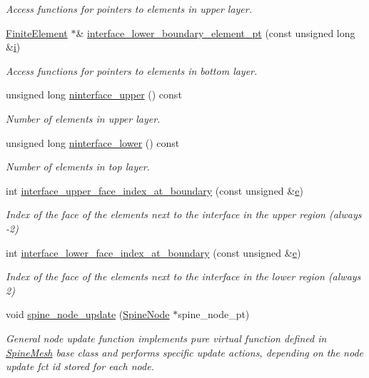 \begin{DoxyCompactItemize}
\begin{DoxyCompactList}\small\item\em Access functions for pointers to elements in upper layer. \end{DoxyCompactList}\item 
\hyperlink{classoomph_1_1FiniteElement}{Finite\+Element} $\ast$\& \hyperlink{classoomph_1_1TwoLayerSpineMesh_a190b41082ad3d8c25c5d3d07040b8933}{interface\+\_\+lower\+\_\+boundary\+\_\+element\+\_\+pt} (const unsigned long \&\hyperlink{cfortran_8h_adb50e893b86b3e55e751a42eab3cba82}{i})
\begin{DoxyCompactList}\small\item\em Access functions for pointers to elements in bottom layer. \end{DoxyCompactList}\item 
unsigned long \hyperlink{classoomph_1_1TwoLayerSpineMesh_adb5035599cf78ba65e53f7183c98e115}{ninterface\+\_\+upper} () const
\begin{DoxyCompactList}\small\item\em Number of elements in upper layer. \end{DoxyCompactList}\item 
unsigned long \hyperlink{classoomph_1_1TwoLayerSpineMesh_a5ad10a9a2022a32e2a5f311f789fae51}{ninterface\+\_\+lower} () const
\begin{DoxyCompactList}\small\item\em Number of elements in top layer. \end{DoxyCompactList}\item 
int \hyperlink{classoomph_1_1TwoLayerSpineMesh_a2f31c7c1ad05803e296545a0a4210164}{interface\+\_\+upper\+\_\+face\+\_\+index\+\_\+at\+\_\+boundary} (const unsigned \&\hyperlink{cfortran_8h_a37cd013acc76697829c324bdd8562d82}{e})
\begin{DoxyCompactList}\small\item\em Index of the face of the elements next to the interface in the upper region (always -\/2) \end{DoxyCompactList}\item 
int \hyperlink{classoomph_1_1TwoLayerSpineMesh_a441e4c3a46f0ba2210130a59be471e09}{interface\+\_\+lower\+\_\+face\+\_\+index\+\_\+at\+\_\+boundary} (const unsigned \&\hyperlink{cfortran_8h_a37cd013acc76697829c324bdd8562d82}{e})
\begin{DoxyCompactList}\small\item\em Index of the face of the elements next to the interface in the lower region (always 2) \end{DoxyCompactList}\item 
void \hyperlink{classoomph_1_1TwoLayerSpineMesh_ad9b80ae7e34be72ca03f6d1bc6062de4}{spine\+\_\+node\+\_\+update} (\hyperlink{classoomph_1_1SpineNode}{Spine\+Node} $\ast$spine\+\_\+node\+\_\+pt)
\begin{DoxyCompactList}\small\item\em General node update function implements pure virtual function defined in \hyperlink{classoomph_1_1SpineMesh}{Spine\+Mesh} base class and performs specific update actions, depending on the node update fct id stored for each node. \end{DoxyCompactList}\end{DoxyCompactItemize}

